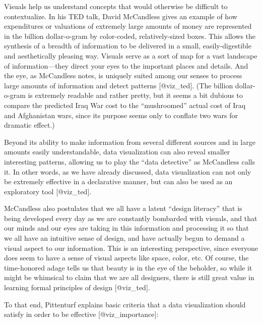 \documentclass[]{book}
\theoremstyle{definition}
\theoremstyle{definition}
\theoremstyle{definition}
\theoremstyle{remark}
\begin{document}
Visuals help us understand concepts that would otherwise be difficult to
contextualize. In his TED talk, David McCandless gives an example of how
expenditures or valuations of extremely large amounts of money are
represented in the billion dollar-o-gram by color-coded,
relatively-sized boxes. This allows the synthesis of a breadth of
information to be delivered in a small, easily-digestible and
aesthetically pleasing way. Visuals serve as a sort of map for a vast
landscape of information---they direct your eyes to the important places
and details. And the eye, as McCandless notes, is uniquely suited among
our senses to process large amounts of information and detect patterns
{[}@viz\_ted{]}. (The billion dollar-o-gram is extremely readable and
rather pretty, but it seems a bit dubious to compare the predicted Iraq
War cost to the ``mushroomed'' actual cost of Iraq and Afghanistan wars,
since its purpose seems only to conflate two wars for dramatic effect.)

Beyond its ability to make information from several different sources
and in large amounts easily understandable, data visualization can also
reveal smaller interesting patterns, allowing us to play the ``data
detective'' as McCandless calls it. In other words, as we have already
discussed, data visualization can not only be extremely effective in a
declarative manner, but can also be used as an exploratory tool
{[}@viz\_ted{]}.

McCandless also postulates that we all have a latent ``design literacy''
that is being developed every day as we are constantly bombarded with
visuals, and that our minds and our eyes are taking in this information
and processing it so that we all have an intuitive sense of design, and
have actually begun to demand a visual aspect to our information. This
is an interesting perspective, since everyone does seem to have a sense
of visual aspects like space, color, etc. Of course, the time-honored
adage tells us that beauty is in the eye of the beholder, so while it
might be whimsical to claim that we are all designers, there is still
great value in learning formal principles of design {[}@viz\_ted{]}.

To that end, Pittenturf explains basic criteria that a data
visualization should satisfy in order to be effective
{[}@viz\_importance{]}:
\end{document}
